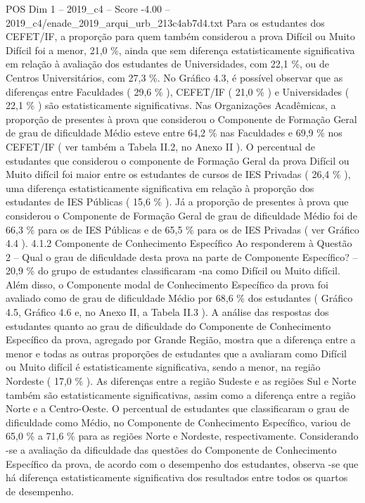 \begin{textsample}{POS Dim 1 – 2019\_c4 – Score -4.00 – 2019\_c4/enade\_2019\_arqui\_urb\_213c4ab7d4.txt}
Para os estudantes dos CEFET/IF, a proporção para quem também considerou a prova Difícil ou Muito Difícil foi a menor, 21,0 \%, ainda que sem diferença estatisticamente significativa em relação à avaliação dos estudantes de Universidades, com 22,1 \%, ou de Centros Universitários, com 27,3 \%.
No Gráfico 4.3, é possível observar que as diferenças entre Faculdades ( 29,6 \% ), CEFET/IF ( 21,0 \% ) e Universidades ( 22,1 \% ) são estatisticamente significativas.
Nas Organizações Acadêmicas, a proporção de presentes à prova que considerou o Componente de Formação Geral de grau de dificuldade Médio esteve entre 64,2 \% nas Faculdades e 69,9 \% nos CEFET/IF ( ver também a Tabela II.2, no Anexo II ).
O percentual de estudantes que considerou o componente de Formação Geral da prova Difícil ou Muito difícil foi maior entre os estudantes de cursos de IES Privadas ( 26,4 \% ), uma diferença estatisticamente significativa em relação à proporção dos estudantes de IES Públicas ( 15,6 \% ).
Já a proporção de presentes à prova que considerou o Componente de Formação Geral de grau de dificuldade Médio foi de 66,3 \% para os de IES Públicas e de 65,5 \% para os de IES Privadas ( ver Gráfico 4.4 ). 4.1.2 Componente de Conhecimento Específico Ao responderem à Questão 2 – Qual o grau de dificuldade desta prova na parte de Componente Específico? – 20,9 \% do grupo de estudantes classificaram -na como Difícil ou Muito difícil.
Além disso, o Componente modal de Conhecimento Específico da prova foi avaliado como de grau de dificuldade Médio por 68,6 \% dos estudantes ( Gráfico 4.5, Gráfico 4.6 e, no Anexo II, a Tabela II.3 ).
A análise das respostas dos estudantes quanto ao grau de dificuldade do Componente de Conhecimento Específico da prova, agregado por Grande Região, mostra que a diferença entre a menor e todas as outras proporções de estudantes que a avaliaram como Difícil ou Muito difícil é estatisticamente significativa, sendo a menor, na região Nordeste ( 17,0 \% ).
As diferenças entre a região Sudeste e as regiões Sul e Norte também são estatisticamente significativas, assim como a diferença entre a região Norte e a Centro-Oeste.
O percentual de estudantes que classificaram o grau de dificuldade como Médio, no Componente de Conhecimento Específico, variou de 65,0 \% a 71,6 \% para as regiões Norte e Nordeste, respectivamente.
Considerando -se a avaliação da dificuldade das questões do Componente de Conhecimento Específico da prova, de acordo com o desempenho dos estudantes, observa -se que há diferença estatisticamente significativa dos resultados entre todos os quartos de desempenho.

\end{textsample}
